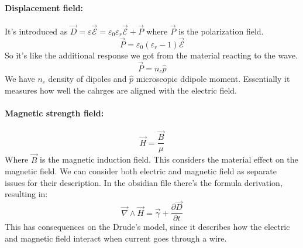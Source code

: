 \paragraph{Displacement field:} It's introduced as $\vec{D} = \varepsilon \vec{\mathcal{E}} = \varepsilon_0\varepsilon_r \vec{\mathcal{E}} + \vec{P}$ where $\vec{P}$ is the polarization field.
\begin{equation}
    \vec{P} = \varepsilon_0(\varepsilon_r - 1)\vec{\mathcal{E}}
\end{equation}
So it's like the additional response we got from the material reacting to the wave.
\begin{equation}
    \vec{P} = n_c \hat{p}
\end{equation}
We have $n_c$ density of dipoles and $\hat{p}$ microscopic ddipole moment. Essentially it measures how well the cahrges are aligned with the electric field.

\paragraph{Magnetic strength field:} 
\begin{equation}
    \vec{H} = \frac{\vec{B}}{\mu}
\end{equation}
Where $\vec{B}$ is the magnetic induction field. This considers the material effect on the magnetic field. We can consider both electric and magnetic field as separate issues for their description. In the obsidian file there's the formula derivation, resulting in:
\begin{equation}
    \vec{\nabla} \wedge \vec{H} = \vec{\gamma} + \frac{\partial \vec{D}}{\partial t}
\end{equation}
This has consequences on the Drude's model, since it describes how the electric and magnetic field interact when current goes through a wire.